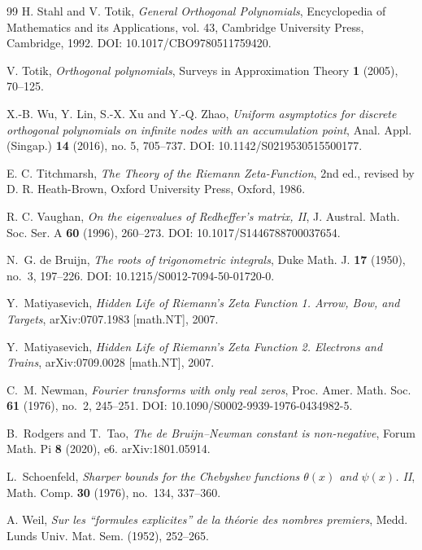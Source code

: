 \documentclass[11pt]{amsart}
\numberwithin{equation}{section}
\theoremstyle{plain}
\theoremstyle{definition}
\theoremstyle{remark}
\begin{document}
\begin{thebibliography}{99}
H. Stahl and V. Totik,
\emph{General Orthogonal Polynomials},
Encyclopedia of Mathematics and its Applications, vol. 43,
Cambridge University Press, Cambridge, 1992.
DOI: 10.1017/CBO9780511759420.

V. Totik,
\emph{Orthogonal polynomials},
Surveys in Approximation Theory \textbf{1} (2005), 70--125.

X.-B. Wu, Y. Lin, S.-X. Xu and Y.-Q. Zhao,
\emph{Uniform asymptotics for discrete orthogonal polynomials on infinite nodes with an accumulation point},
Anal. Appl. (Singap.) \textbf{14} (2016), no. 5, 705--737.
DOI: 10.1142/S0219530515500177.

E. C. Titchmarsh,
\emph{The Theory of the Riemann Zeta-Function},
2nd ed., revised by D. R. Heath-Brown,
Oxford University Press, Oxford, 1986.

R. C. Vaughan,
\emph{On the eigenvalues of Redheffer's matrix, II},
J. Austral. Math. Soc. Ser. A \textbf{60} (1996), 260--273.
DOI: 10.1017/S1446788700037654.


N.~G. de Bruijn,
\emph{The roots of trigonometric integrals},
Duke Math. J. \textbf{17} (1950), no.~3, 197--226.
DOI: 10.1215/S0012-7094-50-01720-0.

Y.~Matiyasevich,
\emph{Hidden Life of Riemann's Zeta Function 1. Arrow, Bow, and Targets},
arXiv:0707.1983 [math.NT], 2007.

Y.~Matiyasevich,
\emph{Hidden Life of Riemann's Zeta Function 2. Electrons and Trains},
arXiv:0709.0028 [math.NT], 2007.

C.~M. Newman,
\emph{Fourier transforms with only real zeros},
Proc. Amer. Math. Soc. \textbf{61} (1976), no.~2, 245--251.
DOI: 10.1090/S0002-9939-1976-0434982-5.

B.~Rodgers and T.~Tao,
\emph{The de Bruijn--Newman constant is non-negative},
Forum Math. Pi \textbf{8} (2020), e6.
arXiv:1801.05914.

L.~Schoenfeld,
\emph{Sharper bounds for the Chebyshev functions \(\theta(x)\) and \(\psi(x)\). II},
Math. Comp. \textbf{30} (1976), no.~134, 337--360.

A. Weil,
\emph{Sur les ``formules explicites'' de la th\'eorie des nombres premiers},
Medd. Lunds Univ. Mat. Sem. (1952), 252--265.

\end{thebibliography}
\end{document}
